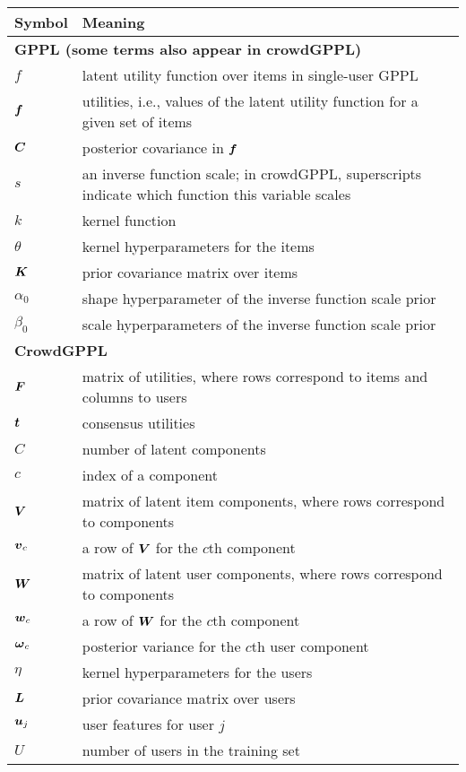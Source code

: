 \begin{table}
 \begin{tabularx}{\columnwidth}{p{1.7cm} X }
 \toprule 
 Symbol & Meaning \\
 \midrule 
\multicolumn{2}{l}{\textbf{GPPL (some terms also appear in crowdGPPL)}} \\
 $f$ & latent utility function over items in single-user GPPL \\
 $\boldsymbol f$ & utilities, i.e., values of the latent utility function for a given set of items \\
 $\boldsymbol C$ & posterior covariance in $\boldsymbol f$ \\
 $s$ & an inverse function scale; in crowdGPPL, superscripts indicate which function this variable scales \\
 $k$ & kernel function \\
 $\theta$ & kernel hyperparameters for the items \\
 $\boldsymbol K$ & prior covariance matrix over items \\
 $\alpha_0$ & shape hyperparameter of the inverse function scale prior \\
 $\beta_0$ & scale hyperparameters of the inverse function scale prior \\
 \multicolumn{2}{l}{\textbf{CrowdGPPL}} \\
 $\boldsymbol F$ & matrix of utilities, where rows correspond to items and columns to users \\
 $\boldsymbol t$ & consensus utilities \\
 $C$ & number of latent components \\
 $c$ & index of a component \\
 $\boldsymbol V$ & matrix of latent item components, where rows correspond to components \\
 $\boldsymbol v_c$ & a row of $\boldsymbol V$ for the $c$th component \\
 $\boldsymbol W$ & matrix of latent user components, where rows correspond to components \\
 $\boldsymbol w_c$ & a row of $\boldsymbol W$ for the $c$th component \\ 
 $\boldsymbol \omega_c$ & posterior variance for the $c$th user component \\
 $\eta$ & kernel hyperparameters for the users \\
 $\boldsymbol L$ & prior covariance matrix over users \\
 $\boldsymbol u_j$ & user features for user $j$ \\
 $U$ & number of users in the training set \\

\end{tabularx}
\end{table}
